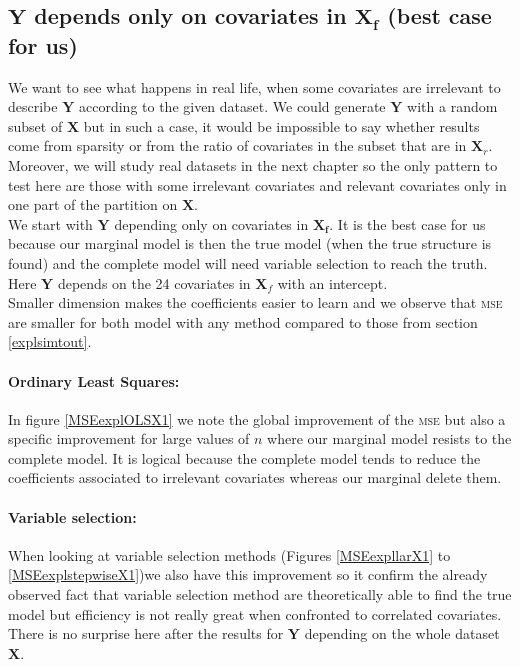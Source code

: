 \documentclass[12pt,a4paper]{report}
\begin{document}
\clearpage
\newpage
\subsection{$\boldsymbol{Y}$ depends only on covariates in $\boldsymbol{X_{f}}$ (best case for us)}	 \label{tableMSEsimdroite}
\FloatBarrier
 We want to see what happens in real life, when some covariates are irrelevant to describe $\boldsymbol{Y}$ according to the given dataset. We could generate $\boldsymbol{Y}$ with a random subset of $\boldsymbol{X}$ but in such a case, it would be impossible to say whether results come from sparsity or from the ratio of covariates in the subset that are in $\boldsymbol{X}_{r}$. Moreover, we will study real datasets in the next chapter so the only pattern to test here are those with some irrelevant covariates and relevant covariates only in one part of the partition on $\boldsymbol{X}$. \\
 
 	We start with $\boldsymbol{Y}$ depending only on covariates in $\boldsymbol{X_{f}}$. It is the best case for us because our marginal model is then the true model (when the true structure is found) and the complete model will need variable selection to reach the truth. Here $\boldsymbol{Y}$ depends on the 24 covariates in $\boldsymbol{X}_{f}$ with an intercept.\\
 	
 	Smaller dimension makes the coefficients easier to learn and we observe that \textsc{mse} are smaller for both model with any method compared to those from section \ref{explsimtout}.\\
 	
 	\paragraph{Ordinary Least Squares:} In figure \ref{MSEexplOLSX1} we note the global improvement of the \textsc{mse} but also a specific improvement for large values of $n$ where our marginal model resists to the complete model. It is logical because the complete model tends to reduce the coefficients associated to irrelevant covariates whereas our marginal delete them. \\
 	
 	\paragraph{Variable selection:} When looking at variable selection methods  (Figures \ref{MSEexpllarX1} to \ref{MSEexplstepwiseX1})we also have this improvement so it confirm the already observed fact that variable selection method are theoretically able to find the true model but efficiency is not really great when confronted to correlated covariates. There is no surprise here after the results for $\boldsymbol{Y}$ depending on the whole dataset $\boldsymbol{X}$. \\
 	
\end{document}
